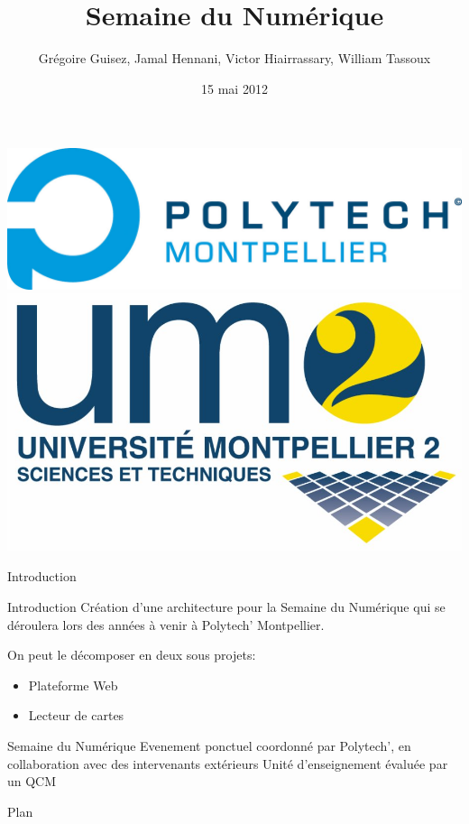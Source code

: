 \documentclass[handout]{beamer}
\title{Semaine du Numérique}
\author[G. Guisez, J. Hennani, V. Hiairrassary, W. Tassoux]{Grégoire Guisez, Jamal Hennani, Victor Hiairrassary, William Tassoux}
\institute{Polytech' Montpellier, Université Montpellier 2}
\date{15 mai 2012}
\begin{document}
\small 



\begin{frame}
    \titlepage

    \includegraphics[scale=0.2]{images/logoPolytech.jpg}
    \hfill
    \hskip8pt
    \includegraphics[scale=0.05]{images/logoUm2.jpg}
\end{frame}


\begin{frame}{Introduction}
    \begin{block}{Introduction}
 		 Création d'une architecture pour la Semaine du Numérique qui se déroulera lors des années à venir à Polytech' Montpellier.

		 On peut le décomposer en deux sous projets:
		\begin{itemize}
			\item Plateforme Web
			\item Lecteur de cartes
		\end{itemize}
	\end{block}

	\begin{block}{Semaine du Numérique}
    Evenement ponctuel coordonné par Polytech', en collaboration avec des intervenants extérieurs
    Unité d'enseignement évaluée par un QCM
	\end{block}	
\end{frame}

\begin{frame}{Plan}
 	\tableofcontents
\end{frame}






\end{document}
